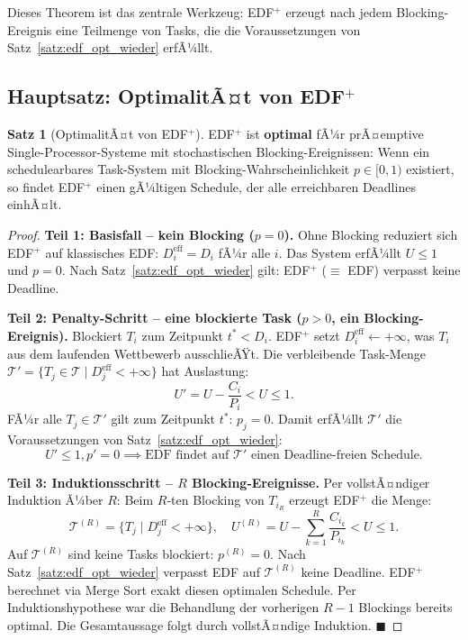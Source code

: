﻿\documentclass[a4paper,12pt]{report}
\theoremstyle{definition}
\newtheorem{satz}{Satz}[chapter]
\begin{document}
Dieses Theorem ist das zentrale Werkzeug: EDF$^+$ erzeugt nach jedem Blocking-Ereignis
eine Teilmenge von Tasks, die die Voraussetzungen von Satz~\ref{satz:edf_opt_wieder}
erfÃ¼llt.

\subsection{Hauptsatz: OptimalitÃ¤t von EDF$^+$}

\begin{satz}[OptimalitÃ¤t von EDF$^+$]
	\label{satz:edfplus_optimal}
	EDF$^+$ ist \textbf{optimal} fÃ¼r prÃ¤emptive Single-Processor-Systeme mit
	stochastischen Blocking-Ereignissen: Wenn ein schedulearbares Task-System mit
	Blocking-Wahrscheinlichkeit $p \in [0,1)$ existiert, so findet EDF$^+$ einen
	gÃ¼ltigen Schedule, der alle erreichbaren Deadlines einhÃ¤lt.
\end{satz}

\begin{proof}
	\textbf{Teil 1: Basisfall -- kein Blocking ($p = 0$).}
	Ohne Blocking reduziert sich EDF$^+$ auf klassisches EDF:
	$D_i^{\text{eff}} = D_i$ fÃ¼r alle $i$. Das System erfÃ¼llt $U \leq 1$ und $p = 0$.
	Nach Satz~\ref{satz:edf_opt_wieder} gilt: EDF$^+$ ($\equiv$ EDF) verpasst keine Deadline.

	\medskip
	\textbf{Teil 2: Penalty-Schritt -- eine blockierte Task ($p > 0$, ein Blocking-Ereignis).}
	Blockiert $T_i$ zum Zeitpunkt $t^* < D_i$. EDF$^+$ setzt
	$D_i^{\text{eff}} \leftarrow +\infty$, was $T_i$ aus dem laufenden Wettbewerb
	ausschlieÃŸt. Die verbleibende Task-Menge
	$\mathcal{T}' = \{T_j \in \mathcal{T} \mid D_j^{\text{eff}} < +\infty\}$
	hat Auslastung:
	\[
		U' = U - \frac{C_i}{P_i} < U \leq 1.
	\]
	FÃ¼r alle $T_j \in \mathcal{T}'$ gilt zum Zeitpunkt $t^*$: $p_j = 0$.
	Damit erfÃ¼llt $\mathcal{T}'$ die Voraussetzungen von Satz~\ref{satz:edf_opt_wieder}:
	\[
		U' \leq 1, p' = 0 \implies \text{EDF findet auf } \mathcal{T}' \text{ einen Deadline-freien Schedule.}
	\]

	\medskip
	\textbf{Teil 3: Induktionsschritt -- $R$ Blocking-Ereignisse.}
	Per vollstÃ¤ndiger Induktion Ã¼ber $R$: Beim $R$-ten Blocking von $T_{i_R}$
	erzeugt EDF$^+$ die Menge:
	\[
		\mathcal{T}^{(R)} = \bigl\{T_j \mid D_j^{\text{eff}} < +\infty\bigr\}, \quad
		U^{(R)} = U - \sum_{k=1}^{R} \frac{C_{i_k}}{P_{i_k}} < U \leq 1.
	\]
	Auf $\mathcal{T}^{(R)}$ sind keine Tasks blockiert: $p^{(R)} = 0$. Nach
	Satz~\ref{satz:edf_opt_wieder} verpasst EDF auf $\mathcal{T}^{(R)}$ keine Deadline.
	EDF$^+$ berechnet via Merge Sort exakt diesen optimalen Schedule. Per
	Induktionshypothese war die Behandlung der vorherigen $R-1$ Blockings bereits
	optimal. Die Gesamtaussage folgt durch vollstÃ¤ndige Induktion. \hfill$\blacksquare$
\end{proof}
\end{document}

